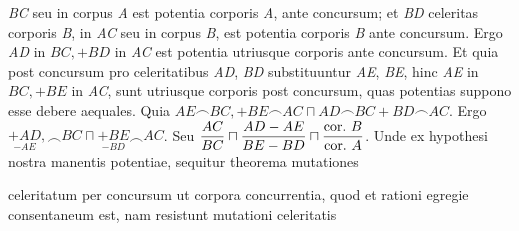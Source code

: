 %
% 
\textit{BC} seu in corpus \textit{A} est
potentia\protect{} corporis \textit{A}, ante concursum;\protect{} et \textit{BD} celeritas corporis \textit{B}, in \textit{AC} seu in corpus \textit{B}, est potentia\protect{} 
corporis \textit{B} ante concursum\protect{}. Ergo \textit{AD} in $BC, + BD$ in \textit{AC} est potentia\protect{} utriusque corporis ante concursum.\protect{} Et quia post 
concursum\protect{} pro celeritatibus \textit{AD}, \textit{BD} substituuntur \textit{AE}, \textit{BE}, hinc \textit{AE} in $BC, + BE$ in \textit{AC}, sunt 
%
%
utriusque corporis post concursum,\protect{} quas potentias\protect{} suppono esse debere aequales.
\pend \pstart
\hspace{1mm}\hspace{-1mm}%
Quia $AE \smallfrown BC, + BE \smallfrown AC \sqcap  AD \smallfrown BC + BD \smallfrown AC$. Ergo $ \underset{\displaystyle -AE}{+AD}, \smallfrown BC \sqcap \underset{\displaystyle -BD}{+BE} \smallfrown AC$. Seu $\displaystyle\frac{AC}{BC} \sqcap \displaystyle\frac{AD-AE}{BE-BD} \sqcap \displaystyle\frac{\textup{cor.}\ B}{\textup{cor.}\ A}$.%
%
Unde ex hypothesi nostra manentis potentiae,\protect{} sequitur theorema\protect{} mutationes 
\rule[0cm]{0mm}{10pt}%
celeritatum\protect{} per concursum\protect{}
%
%
ut corpora concurrentia, quod et rationi%
\protect{} egregie consentaneum est, nam resistunt mutationi celeritatis%
